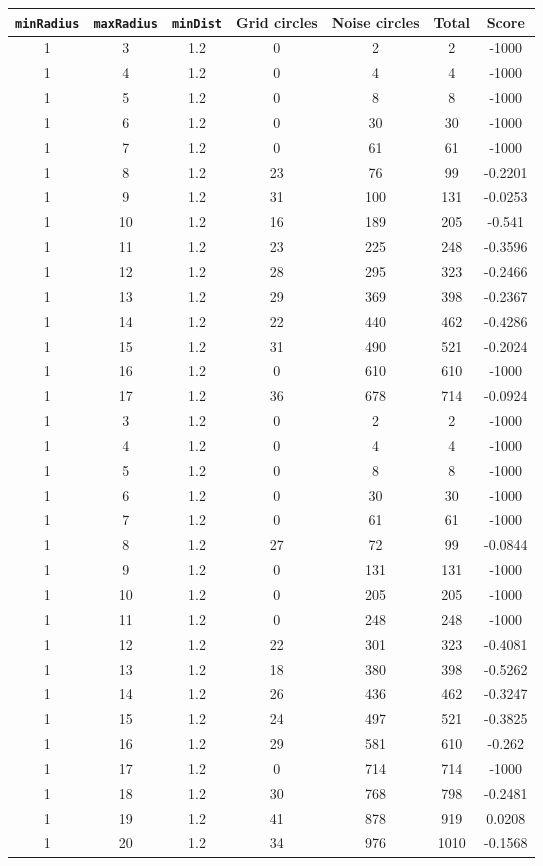 \documentclass[letterpaper, 12pt]{article}
\begin{document}
\begin{longtable}{|c|c|c|c|c|c|c|}
\hline
\textbf{\texttt{minRadius}} & \textbf{\texttt{maxRadius}} & \textbf{\texttt{minDist}} & \textbf{Grid circles} & \textbf{Noise circles} & \textbf{Total} & \textbf{Score} \\
\hline
1 & 3 & 1.2 & 0 & 2 & 2 & -1000 \\
\hline
1 & 4 & 1.2 & 0 & 4 & 4 & -1000 \\
\hline
1 & 5 & 1.2 & 0 & 8 & 8 & -1000 \\
\hline
1 & 6 & 1.2 & 0 & 30 & 30 & -1000 \\
\hline
1 & 7 & 1.2 & 0 & 61 & 61 & -1000 \\
\hline
1 & 8 & 1.2 & 23 & 76 & 99 & -0.2201 \\
\hline
1 & 9 & 1.2 & 31 & 100 & 131 & -0.0253 \\
\hline
1 & 10 & 1.2 & 16 & 189 & 205 & -0.541 \\
\hline
1 & 11 & 1.2 & 23 & 225 & 248 & -0.3596 \\
\hline
1 & 12 & 1.2 & 28 & 295 & 323 & -0.2466 \\
\hline
1 & 13 & 1.2 & 29 & 369 & 398 & -0.2367 \\
\hline
1 & 14 & 1.2 & 22 & 440 & 462 & -0.4286 \\
\hline
1 & 15 & 1.2 & 31 & 490 & 521 & -0.2024 \\
\hline
1 & 16 & 1.2 & 0 & 610 & 610 & -1000 \\
\hline
1 & 17 & 1.2 & 36 & 678 & 714 & -0.0924 \\
\hline
1 & 3 & 1.2 & 0 & 2 & 2 & -1000 \\
\hline
1 & 4 & 1.2 & 0 & 4 & 4 & -1000 \\
\hline
1 & 5 & 1.2 & 0 & 8 & 8 & -1000 \\
\hline
1 & 6 & 1.2 & 0 & 30 & 30 & -1000 \\
\hline
1 & 7 & 1.2 & 0 & 61 & 61 & -1000 \\
\hline
1 & 8 & 1.2 & 27 & 72 & 99 & -0.0844 \\
\hline
1 & 9 & 1.2 & 0 & 131 & 131 & -1000 \\
\hline
1 & 10 & 1.2 & 0 & 205 & 205 & -1000 \\
\hline
1 & 11 & 1.2 & 0 & 248 & 248 & -1000 \\
\hline
1 & 12 & 1.2 & 22 & 301 & 323 & -0.4081 \\
\hline
1 & 13 & 1.2 & 18 & 380 & 398 & -0.5262 \\
\hline
1 & 14 & 1.2 & 26 & 436 & 462 & -0.3247 \\
\hline
1 & 15 & 1.2 & 24 & 497 & 521 & -0.3825 \\
\hline
1 & 16 & 1.2 & 29 & 581 & 610 & -0.262 \\
\hline
1 & 17 & 1.2 & 0 & 714 & 714 & -1000 \\
\hline
1 & 18 & 1.2 & 30 & 768 & 798 & -0.2481 \\
\hline
1 & 19 & 1.2 & 41 & 878 & 919 & 0.0208 \\
\hline
1 & 20 & 1.2 & 34 & 976 & 1010 & -0.1568 \\
\hline
\end{longtable}
\end{document}
